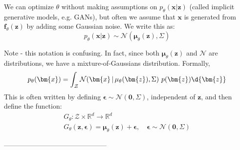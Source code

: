 \documentclass{article}
\begin{document}
We can optimize $\theta$ without making assumptions on $p_{\theta}(\bm{x} | \bm{z})$ (called implicit generative models, e.g. GANs), but often we assume that $\bm{x}$ is generated from $\bm{f}_{\theta}(\bm{z})$ by adding some Gaussian noise. We write this as:
\begin{equation} \label{eq:posteriorGaussianAssumption}
  p_{\theta}(\bm{x} | \bm{z}) \sim  \mathcal{N}(\bm{\mu}_{\theta}(\bm{z}), \Sigma)
\end{equation}

Note - this notation is confusing. In fact, since both $\bm{\mu}_{\theta}(\bm{z})$ and $\mathcal{N}$ are distributions, we have a mixture-of-Gaussians distribution.  Formally,
\[
  p_{\theta}(\bm{x}) = \int_{\mathcal{Z}} \mathcal{N}(\bm{x} \, | \, \mu_{\theta}(\bm{z}), \Sigma) \ p(\bm{z}) \d{\bm{z}}
\]
This is often written by defining $\bm{\epsilon} \sim \mathcal{N}(\bm{0}, \Sigma)$, independent of $\bm{z}$, and then define the function:
\begin{gather*}
  G_{\theta}: \mathcal{Z} \times \mathbb{R}^{d} \to \mathbb{R}^{d} \\ 
  G_{\theta}(\bm{z}, \bm{\epsilon}) = \bm{\mu}_{\theta}(\bm{z}) + \bm{\epsilon},  \quad  \bm{\epsilon} \sim  \mathcal{N}(\bm{0}, \Sigma)
\end{gather*}

 --------------------------------------------- 
\end{document}
